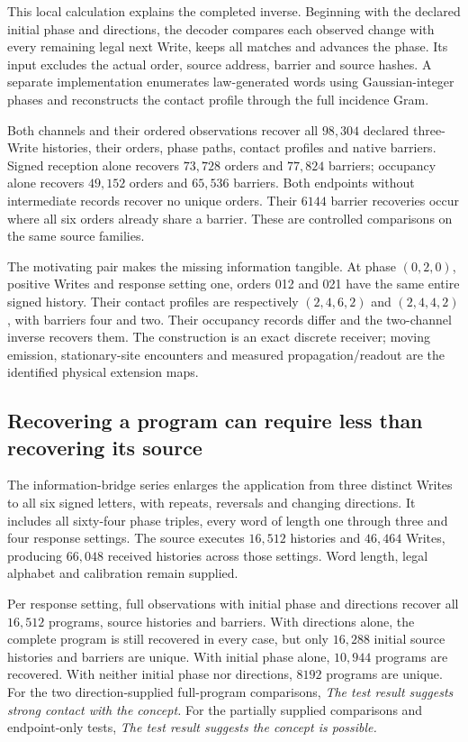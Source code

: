 This local calculation explains the completed inverse. Beginning with the declared initial phase and directions, the decoder compares each observed change with every remaining legal next Write, keeps all matches and advances the phase. Its input excludes the actual order, source address, barrier and source hashes. A separate implementation enumerates law-generated words using Gaussian-integer phases and reconstructs the contact profile through the full incidence Gram.

Both channels and their ordered observations recover all $98{,}304$ declared three-Write histories, their orders, phase paths, contact profiles and native barriers. Signed reception alone recovers $73{,}728$ orders and $77{,}824$ barriers; occupancy alone recovers $49{,}152$ orders and $65{,}536$ barriers. Both endpoints without intermediate records recover no unique orders. Their $6144$ barrier recoveries occur where all six orders already share a barrier. These are controlled comparisons on the same source families.

The motivating pair makes the missing information tangible. At phase $(0,2,0)$, positive Writes and response setting one, orders 012 and 021 have the same entire signed history. Their contact profiles are respectively $(2,4,6,2)$ and $(2,4,4,2)$, with barriers four and two. Their occupancy records differ and the two-channel inverse recovers them. The construction is an exact discrete receiver; moving emission, stationary-site encounters and measured propagation/readout are the identified physical extension maps.

\subsection{Recovering a program can require less than recovering its source}

The information-bridge series enlarges the application from three distinct Writes to all six signed letters, with repeats, reversals and changing directions. It includes all sixty-four phase triples, every word of length one through three and four response settings. The source executes $16{,}512$ histories and $46{,}464$ Writes, producing $66{,}048$ received histories across those settings. Word length, legal alphabet and calibration remain supplied. 

Per response setting, full observations with initial phase and directions recover all $16{,}512$ programs, source histories and barriers. With directions alone, the complete program is still recovered in every case, but only $16{,}288$ initial source histories and barriers are unique. With initial phase alone, $10{,}944$ programs are recovered. With neither initial phase nor directions, $8192$ programs are unique. For the two direction-supplied full-program comparisons, \emph{The test result suggests strong contact with the concept.} For the partially supplied comparisons and endpoint-only tests, \emph{The test result suggests the concept is possible.}


